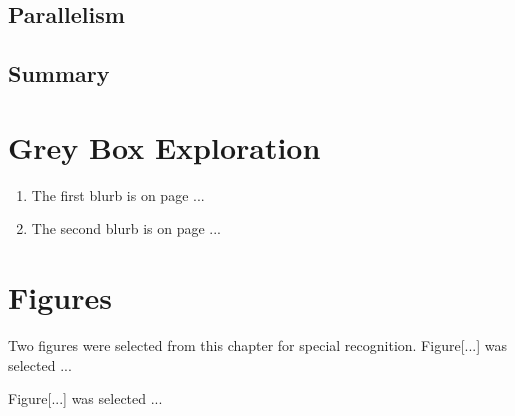 \documentclass[12pt]{article}
\begin{document}
\subsection{Parallelism}

\subsection{Summary}

\section{Grey Box Exploration}

\begin{enumerate}
    \item The first blurb is on page ...

    \item The second blurb is on page ...
\end{enumerate}

\section{Figures}

Two figures were selected from this chapter for special recognition. Figure[...] was selected ...


Figure[...] was selected ...

\end{document}

